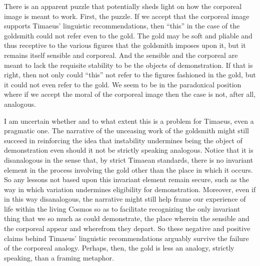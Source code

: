 There is an apparent puzzle that potentially sheds light on how the corporeal image is meant to work. First, the puzzle. If we accept that the corporeal image supports Timaeus' linguistic recommendations, then ``this'' in the case of the goldsmith could not refer even to the gold. The gold may be soft and pliable and thus receptive to the various figures that the goldsmith imposes upon it, but it remains itself sensible and corporeal. And the sensible and the corporeal are meant to lack the requisite stability to be the objects of demonstration. If that is right, then not only could ``this'' not refer to the figures fashioned in the gold, but it could not even refer to the gold. We seem to be in the paradoxical position where if we accept the moral of the corporeal image then the case is not, after all, analogous. 

I am uncertain whether and to what extent this is a problem for Timaeus, even a pragmatic one. The narrative of the unceasing work of the goldsmith might still succeed in reinforcing the idea that instability undermines being the object of demonstration even should it not be strictly speaking analogous. Notice that it is disanalogous in the sense that, by strict Timaean standards, there is no invariant element in the process involving the gold other than the place in which it occurs. So any lessons not based upon this invariant element remain secure, such as the way in which variation undermines eligibility for demonstration. Moreover, even if in this way disanalogous, the narrative might still help frame our experience of life within the living Cosmos so as to facilitate recognizing the only invariant thing that we so much as could demonstrate, the place wherein the sensible and the corporeal appear and wherefrom they depart. So these negative and positive claims behind Timaeus' linguistic recommendations arguably survive the failure of the corporeal analogy. Perhaps, then, the gold is less an analogy, strictly speaking, than a framing metaphor.

